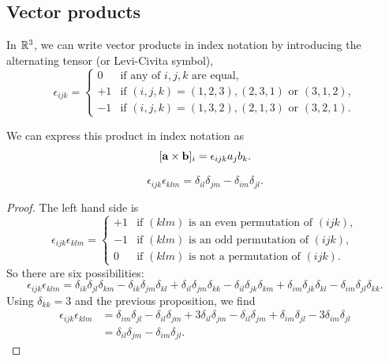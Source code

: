 \documentclass[10pt, a4paper]{article}
\begin{document}
\subsection{Vector products}

In $\mathbb{R} ^ 3$,
we can write vector products in index notation by introducing the alternating tensor
(or Levi-Civita symbol),
\[
\epsilon_{ijk} = \begin{cases}
    0 &\text{if any of $i, j, k$ are equal}, \\
    +1 &\text{if $(i, j, k) = (1, 2, 3), (2, 3, 1)$ or $(3, 1, 2)$}, \\
    -1 &\text{if $(i, j, k) = (1, 3, 2), (2, 1, 3)$ or $(3, 2, 1)$}.
\end{cases}
\]

We can express this product in index notation as
\[
[\mathbf{a} \times \mathbf{b}]_{i} = \epsilon_{ijk}a_jb_k.
\]

\begin{proposition}
    \[
    \epsilon_{ijk}\epsilon_{klm} = \delta_{il}\delta_{jm} - \delta_{im}\delta_{jl}.
    \]

    \begin{proof}
        The left hand side is
        \[
        \epsilon_{ijk}\epsilon_{klm} = \begin{cases}
            +1 &\text{if $(klm)$ is an even permutation of $(ijk)$}, \\
            -1 &\text{if $(klm)$ is an odd permutation of $(ijk)$}, \\
            0 &\text{if $(klm)$ is not a permutation of $(ijk)$}.
        \end{cases}
        \]
        So there are six possibilities:
        \[
        \epsilon_{ijk}\epsilon_{klm} = \delta_{ik}\delta_{jl}\delta_{km} - \delta_{ik}\delta_{jm}\delta_{kl} + \delta_{il}\delta_{jm}\delta_{kk} - \delta_{il}\delta_{jk}\delta_{km} + \delta_{im}\delta_{jk}\delta_{kl} - \delta_{im}\delta_{jl}\delta_{kk}.
        \]
        Using $\delta_{kk} = 3$ and the previous proposition,
        we find
        \begin{align*}
        \epsilon_{ijk}\epsilon_{klm} &= \delta_{im}\delta_{jl} - \delta_{il}\delta_{jm} + 3\delta_{il}\delta_{jm} - \delta_{il}\delta_{jm} + \delta_{im}\delta_{jl} - 3\delta_{im}\delta_{jl} \\
        &= \delta_{il}\delta_{jm} - \delta_{im}\delta_{jl}.
        \end{align*}
    \end{proof}
\end{proposition}
\end{document}
